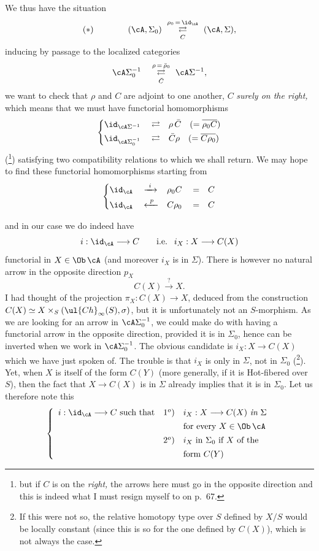 We thus have the situation
\[
(*)\qquad\qquad(\cA,\Sigma_0)\ \underset{C}{\overset{\rho_0\,=\,\id_{\cA}}{\rightleftarrows}}\ (\cA,\Sigma),
\]
inducing by passage to the localized categories
\[
\cA\Sigma_0^{-1}\quad\underset{\bar{C}}{\overset{\rho\,=\,\bar{\rho}_0}{\rightleftarrows}}\ \cA\Sigma^{-1},
\]
we want to check that $\rho$ and $C$ are adjoint to one another, $C$ \textit{surely on the right,} which means that we must have functorial homomorphisms
\[
\left\{
\begin{aligned}
&\id_{\cA\Sigma^{-1}}&&\rightleftarrows&&\rho\,\bar{C}\quad(=\overline{\rho_0C})\\
&\id_{\cA\Sigma_0^{-1}}&&\rightleftarrows&&\bar{C}\rho\quad(=\overline{C\rho_0})
\end{aligned}
\right.
\]
(\footnote[41]{but if $C$ is on the \textit{right,} the arrows here must go in the opposite direction and this is indeed what I must resign myself to on p.~67.}) satisfying two compatibility relations to which we shall return. We may hope to find these functorial homomorphisms starting from
\[
\left\{
\begin{aligned}
&\id_{\cA}&&\xrightarrow{\ i\ }&&\rho_0C&&=&&C\\
&\id_{\cA}&&\xleftarrow{\ p\ }&&C\rho_0&&=&&C
\end{aligned}
\right.
\]

and in our case we do indeed have
\[
i:\id_{\cA}\longrightarrow C\qquad\text{i.e. }\ i_X:X\longrightarrow C(X)
\]
functorial in $X\in\Ob\,\cA$ (and moreover $i_X$ is in $\Sigma$). There is however no natural arrow in the opposite direction $p_X$
\[
C(X)\xrightarrow{\ ?\ }X.
\]
I had thought of the projection $\pi_X:C(X)\longrightarrow X$, deduced from the construction $C(X)\simeq X\times_S(\ul{Ch}_\infty(S),\sigma)$, but it is unfortunately not an $S$-morphism. As we are looking for an arrow in $\cA\Sigma_0^{-1}$, we could make do with having a functorial arrow in the opposite direction, provided it is in $\Sigma_0$, hence can be inverted when we work in $\cA\Sigma_0^{-1}$. The obvious candidate is $i_X:X\longrightarrow C(X)$ which we have just spoken of. The trouble is that $i_X$ is only in $\Sigma$, not in $\Sigma_0$ (\footnote[42]{If this were not so, the relative homotopy type over $S$ defined by $X/S$ would be locally constant (since this is so for the one defined by $C(X)$), which is not always the case.}). Yet, when $X$ is itself of the form $C(Y)$ (more generally, if it is Hot-fibered over $S$), then the fact that $X\longrightarrow C(X)$ is in $\Sigma$ already implies that it is in $\Sigma_0$. Let us therefore note this %
\[
\left\{
\begin{array}{lrl}
i:\id_{\cA}\longrightarrow C\ \text{such that} & 1^o) & i_X:X\longrightarrow C(X)\ \textit{in}\ \Sigma\\[1ex]
 & & \text{for every }X\in\Ob\,\cA\\[1ex]
 & 2^o) & i_X\ \text{in }\Sigma_0\text{ if }X\text{ of the}\\[1ex]
 & & \text{form }C(Y)
\end{array}
\right.
\]

